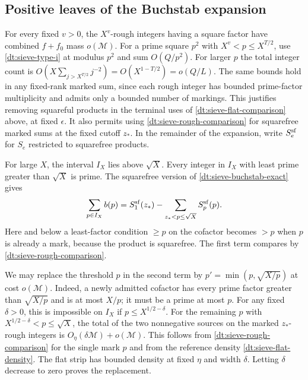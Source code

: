 \documentclass[11pt,a4paper]{article}
\theoremstyle{paperplain}
\numberwithin{equation}{section}
\begin{document}
\subsection{Positive leaves of the Buchstab expansion}
\label{dt:sieve-leaves}

For every fixed \(v>0\), the \(X^v\)-rough integers having a square
factor have combined \(f+f_0\) mass \(o(\mathcal M)\). For a
prime square \(p^2\) with \(X^v<p\le X^{T/2}\), use
\eqref{dt:sieve-type-i} at modulus \(p^2\) and sum \(O(Q/p^2)\).
For larger \(p\) the total integer count is
\(O(X\sum_{j>X^{T/2}}j^{-2})=O(X^{1-T/2})=o(Q/L)\).
The same bounds hold in any fixed-rank marked sum, since
each rough integer has bounded prime-factor multiplicity and
admits only a bounded number of markings. This justifies
removing squareful products in the terminal uses of
\eqref{dt:sieve-flat-comparison} above, at fixed \(\epsilon\).
It also permits using \eqref{dt:sieve-rough-comparison} for
squarefree marked sums at the fixed cutoff \(z_*\).
In the remainder of the expansion, write \(S_e^{\rm sf}\)
for \(S_e\) restricted to squarefree products.

For large \(X\), the interval \(I_X\) lies above \(\sqrt X\).
Every integer in \(I_X\) with least prime greater than
\(\sqrt X\) is prime. The squarefree version of
\eqref{dt:sieve-buchstab-exact} gives
\begin{equation}
 \sum_{p\in I_X}b(p)
     =S_1^{\rm sf}(z_*)-
       \sum_{z_*<p\le\sqrt X}S_p^{\rm sf}(p).
 \label{dt:sieve-first-step}
\end{equation}
Here and below a least-factor condition \(\ge p\) on the
cofactor becomes \(>p\) when \(p\) is already a mark,
because the product is squarefree. The first term compares
by \eqref{dt:sieve-rough-comparison}.

We may replace the threshold \(p\) in the second term by
\(p'=\min(p,\sqrt{X/p})\) at cost \(o(\mathcal M)\).
Indeed, a newly admitted cofactor has every prime factor
greater than \(\sqrt{X/p}\) and is at most \(X/p\);
it must be a prime at most \(p\). For any fixed
\(\delta>0\), this is impossible on \(I_X\) if
\(p\le X^{1/2-\delta}\). For the remaining \(p\) with
\(X^{1/2-\delta}<p\le\sqrt X\), the total of the two
nonnegative sources on the marked \(z_*\)-rough integers
is \(O_\eta(\delta\mathcal M)+o(\mathcal M)\).
This follows from \eqref{dt:sieve-rough-comparison} for the
single mark \(p\) and from the reference density
\eqref{dt:sieve-flat-density}. The flat strip has
bounded density at fixed \(\eta\) and width \(\delta\).
Letting \(\delta\) decrease to zero proves the replacement.
\end{document}
